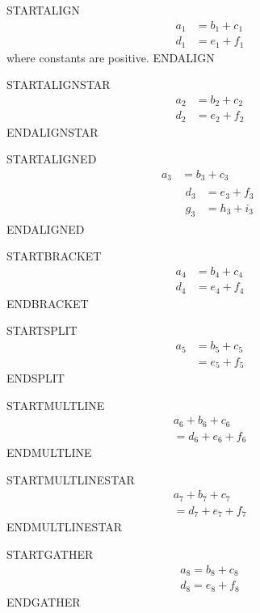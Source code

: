 \documentclass{article}
\newenvironment{proof}{}{}
\begin{document}
\begin{proof}
STARTALIGN
\begin{align}
  a_1 &= b_1 + c_1 \label{eq:unicode-😀} \\
  d_1 &= e_1 +
    f_1
\end{align}\end{proof} where constants are positive.
ENDALIGN

\newpage
STARTALIGNSTAR
\begin{align*}
  a_2 &= b_2 + c_2 \\ d_2 &= e_2 + f_2
\end{align*}
ENDALIGNSTAR

\newpage
STARTALIGNED
\begin{equation}
  \begin{aligned}
    a_3 &= b_3 + c_3 \\
    &\begin{aligned}
      d_3 &= e_3 + f_3 \\
      g_3 &= h_3 + i_3
    \end{aligned}
  \end{aligned}
\end{equation}
ENDALIGNED

\newpage
STARTBRACKET
\[
  \begin{aligned}
    a_4 &= b_4 + c_4 \\
    d_4 &= e_4 + f_4
  \end{aligned}
\]
ENDBRACKET

\newpage
STARTSPLIT
\begin{equation*}
  \begin{split}
    a_5 &= b_5 + c_5 \\
        &= e_5 + f_5
  \end{split}
\end{equation*}
ENDSPLIT

\newpage
STARTMULTLINE
\begin{multline}
  a_6 + b_6 + c_6 \\
  = d_6 + e_6 + f_6
\end{multline}
ENDMULTLINE

\newpage
STARTMULTLINESTAR
\begin{multline*}
  a_7 + b_7 + c_7 \\
  = d_7 + e_7 + f_7
\end{multline*}
ENDMULTLINESTAR

\newpage
STARTGATHER
\begin{gather}
  a_8 = b_8 + c_8 \\
  d_8 = e_8 + f_8
\end{gather}
ENDGATHER
\end{document}
